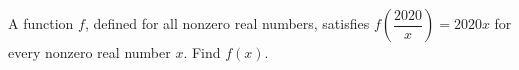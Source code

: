 A function $f$, defined for all nonzero real numbers, satisfies $f\left(\dfrac{2020}{x}\right)=2020x$ for every nonzero real number $x$. Find $f(x)$.
